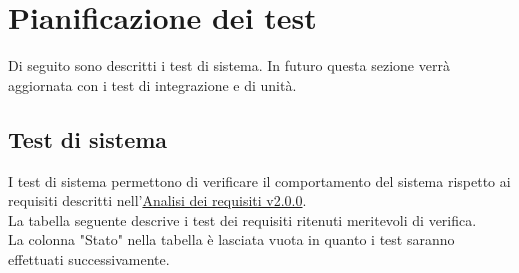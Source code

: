 \documentclass{scalatekids-article}
\begin{document}
\section{Pianificazione dei test}
Di seguito sono descritti i test di sistema. In futuro questa sezione verrà aggiornata con i test di integrazione e di unità.

\subsection{Test di sistema}

I test di sistema permettono di verificare il comportamento del sistema rispetto ai requisiti descritti nell'\href{run:./AnalisiDeiRequisiti\_v2.0.0.pdf}{Analisi dei requisiti v2.0.0}.\\
La tabella seguente descrive i test dei requisiti ritenuti meritevoli di verifica. \\
La colonna "Stato" nella tabella è lasciata vuota in quanto i test saranno effettuati successivamente.
\end{document}
